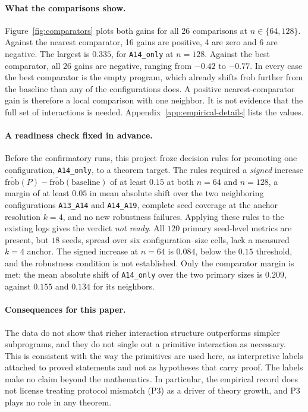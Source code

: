 \paragraph{What the comparisons show.}
Figure~\ref{fig:comparators} plots both gains for all 26 comparisons at $n\in\{64,128\}$. Against the nearest comparator, 16 gains are positive, 4 are zero and 6 are negative. The largest is $0.335$, for \texttt{A14\_only} at $n=128$. Against the best comparator, all 26 gains are negative, ranging from $-0.42$ to $-0.77$. In every case the best comparator is the empty program, which already shifts $\mathrm{frob}$ further from the baseline than any of the configurations does. A positive nearest-comparator gain is therefore a local comparison with one neighbor. It is not evidence that the full set of interactions is needed. Appendix~\ref{app:empirical-details} lists the values.

\paragraph{A readiness check fixed in advance.}
Before the confirmatory runs, this project froze decision rules for promoting one configuration, \texttt{A14\_only}, to a theorem target. The rules required a \emph{signed} increase $\overline{\mathrm{frob}}(P)-\overline{\mathrm{frob}}(\text{baseline})$ of at least $0.15$ at both $n=64$ and $n=128$, a margin of at least $0.05$ in mean absolute shift over the two neighboring configurations \texttt{A13\_A14} and \texttt{A14\_A19}, complete seed coverage at the anchor resolution $k=4$, and no new robustness failures. Applying these rules to the existing logs gives the verdict \emph{not ready}. All $120$ primary seed-level metrics are present, but $18$ seeds, spread over six configuration--size cells, lack a measured $k=4$ anchor. The signed increase at $n=64$ is $0.084$, below the $0.15$ threshold, and the robustness condition is not established. Only the comparator margin is met: the mean absolute shift of \texttt{A14\_only} over the two primary sizes is $0.209$, against $0.155$ and $0.134$ for its neighbors.

\paragraph{Consequences for this paper.}
The data do not show that richer interaction structure outperforms simpler subprograms, and they do not single out a primitive interaction as necessary. This is consistent with the way the primitives are used here, as interpretive labels attached to proved statements and not as hypotheses that carry proof. The labels make no claim beyond the mathematics. In particular, the empirical record does not license treating protocol mismatch (P3) as a driver of theory growth, and P3 plays no role in any theorem.
